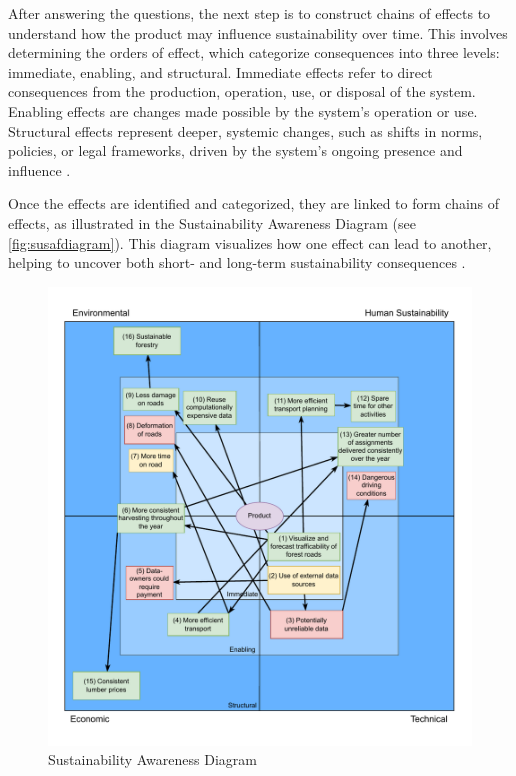 After answering the questions, the next step is to construct chains of effects to understand how the product may influence sustainability over time. This involves determining the orders of effect, which categorize consequences into three levels: immediate, enabling, and structural. Immediate effects refer to direct consequences from the production, operation, use, or disposal of the system. Enabling effects are changes made possible by the system’s operation or use. Structural effects represent deeper, systemic changes, such as shifts in norms, policies, or legal frameworks, driven by the system’s ongoing presence and influence \cite{susosusaf}.

Once the effects are identified and categorized, they are linked to form chains of effects, as illustrated in the Sustainability Awareness Diagram (see \autoref{fig:susafdiagram}). This diagram visualizes how one effect can lead to another, helping to uncover both short- and long-term sustainability consequences \cite{susosusaf}.

\begin{figure}[h]
    \centering
    \includegraphics[width=1\linewidth]{figures/susaf.pdf}
    \caption{Sustainability Awareness Diagram}
    \label{fig:susafdiagram}
\end{figure}

